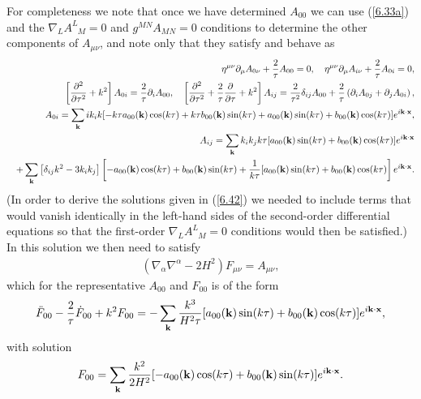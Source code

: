 \documentclass[aps,onecolumn,10pt]{revtex4}
\numberwithin{equation}{section}
\numberwithin{equation}{section}
\begin{document}
For completeness we note that once we have determined $A_{00}$ we can use (\ref{6.33a}) and the $\nabla_{L}A^{L}_{\phantom{L}M}=0$ and $g^{MN}A_{MN}=0$ conditions to determine the other components of $A_{\mu\nu}$, and note only that they satisfy and behave as  
%
\begin{eqnarray}
&&
\eta^{\mu\nu}\partial_{\mu}A_{0\nu}+\frac{2}{\tau}A_{00}=0,\quad \eta^{\mu\nu}\partial_{\mu}A_{i\nu}+\frac{2}{\tau}A_{0i}=0,
\nonumber\\
&&\left[\frac{\partial^2}{\partial\tau^2}+k^2\right]A_{0i}=\frac{2}{\tau}\partial_iA_{00},\quad\left[\frac{\partial^2}{\partial\tau^2}+\frac{2}{\tau}\frac{\partial}{\partial \tau}+k^2\right]A_{ij} =\frac{2}{\tau^2}\delta_{ij}A_{00}+\frac{2}{\tau}\left(\partial_iA_{0j}+\partial_jA_{0i}\right),
\nonumber\\
&&A_{0i}=\sum_{\bf k} ik_ik[-k\tau a_{00}({\bf k})\cos(k\tau)+k\tau b_{00} ({\bf k})\sin(k\tau)
+a_{00}({\bf k})\sin(k\tau)+b_{00} ({\bf k})\cos(k\tau)]e^{i{\bf k}\cdot {\bf x}}, 
\nonumber\\
&&A_{ij}=\sum_{\bf k}k_ik_jk\tau[a_{00}({\bf k})\sin(k\tau)+b_{00} ({\bf k})\cos(k\tau)]e^{i{\bf k}\cdot {\bf x}}
\nonumber\\
&&+\sum_{\bf k}\left[\delta_{ij}k^2-3k_ik_j\right]\left[-a_{00} ({\bf k})\cos(k\tau)+b_{00}({\bf k})\sin(k\tau)+\frac{1}{k\tau}[a_{00} ({\bf k})\sin(k\tau)+b_{00}({\bf k})\cos(k\tau)
\right]e^{i{\bf k}\cdot {\bf x}}.
\label{6.42}
\end{eqnarray}
%
(In order to derive the solutions given in (\ref{6.42}) we needed to include terms that would vanish identically in the left-hand sides of the second-order differential equations so that the first-order $\nabla_{L}A^{L}_{\phantom{L}M}=0$ conditions would then be satisfied.) In this solution we then need to satisfy 
%
\begin{eqnarray}
(\nabla_{\alpha}\nabla^{\alpha}-2H^2)F_{\mu\nu}=A_{\mu\nu},
\label{6.43}
\end{eqnarray}
%
which for the representative $A_{00}$ and $F_{00}$ is of the form
%
\begin{eqnarray}
\ddot{F}_{00}-\frac{2}{\tau}\dot{F}_{00}+k^2F_{00}=-\sum_{\bf k}\frac{k^3}{H^2\tau} [a_{00}({\bf k})\sin(k\tau)+b_{00} ({\bf k})\cos(k\tau)]e^{i{\bf k}\cdot {\bf x}},
\label{6.44}
\end{eqnarray}
% 
with solution
%
\begin{eqnarray}
F_{00}=\sum_{\bf k}\frac{k^2}{2H^2} [-a_{00}({\bf k})\cos(k\tau)+b_{00} ({\bf k})\sin(k\tau)]e^{i{\bf k}\cdot {\bf x}}.
\label{6.45}
\end{eqnarray}
% 
\end{document}
